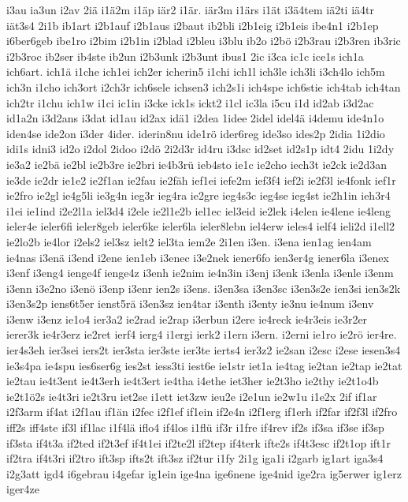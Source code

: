 {i3au
ia3un
i2av
2iä
i1ä2m
i1äp
iär2
i1är.
iär3m
i1ärs
i1ät
i3ä4tem
iä2ti
iä4tr
iät3s4
2i1b
ib1art
i2b1auf
i2b1aus
i2baut
ib2bli
i2b1eig
i2b1eis
ibe4n1
i2b1ep
i6ber6geb
ibe1ro
i2bim
i2b1in
i2blad
i2bleu
i3blu
ib2o
i2bö
i2b3rau
i2b3ren
ib3ric
i2b3roc
ib2ser
ib4ste
ib2un
i2b3unk
i2b3unt
ibus1
2ic
i3ca
ic1c
ice1s
ich1a
ich6art.
ich1ä
i1che
ich1ei
ich2er
icherin5
i1chi
ich1l
ich3le
ich3li
i3ch4lo
ich5m
ich3n
i1cho
ich3ort
i2ch3r
ich6sele
ichsen3
ich2s1i
ich4spe
ich6stie
ich4tab
ich4tan
ich2tr
i1chu
ich1w
i1ci
ic1in
i3cke
ick1s
ickt2
i1cl
ic3la
i5cu
i1d
id2ab
i3d2ac
id1a2n
i3d2ans
i3dat
id1au
id2ax
idä1
i2dea
1idee
2idel
idel4ä
i4demu
ide4n1o
iden4se
ide2on
i3der
4ider.
iderin8nu
ide1rö
ider6reg
ide3so
ides2p
2idia
1i2dio
idi1s
idni3
id2o
i2dol
2idoo
i2dö
2i2d3r
id4ru
i3dsc
id2set
id2s1p
idt4
2idu
1i2dy
ie3a2
ie2bä
ie2bl
ie2b3re
ie2bri
ie4b3rü
ieb4sto
ie1c
ie2cho
iech3t
ie2ck
ie2d3an
ie3de
ie2dr
ie1e2
ie2f1an
ie2fau
ie2fäh
ief1ei
iefe2m
ief3f4
ief2i
ie2f3l
ie4fonk
ief1r
ie2fro
ie2gl
ie4g5li
ie3g4n
ieg3r
ieg4ra
ie2gre
ieg4s3c
ieg4se
ieg4st
ie2h1in
ieh3r4
i1ei
ie1ind
i2e2l1a
iel3d4
i2ele
ie2l1e2b
iel1ec
iel3eid
ie2lek
i4elen
ie4lene
ie4leng
ieler4e
ieler6fi
ieler8geb
ieler6ke
ieler6la
ieler8lebn
iel4erw
ieles4
ielf4
ieli2d
i1ell2
ie2lo2b
ie4lor
i2els2
iel3sz
ielt2
iel3ta
iem2e
2i1en
i3en.
i3ena
ien1ag
ien4am
ie4nas
i3enä
i3end
i2ene
ien1eb
i3enec
i3e2nek
iener6fo
ien3er4g
iener6la
i3enex
i3enf
i3eng4
ienge4f
ienge4z
i3enh
ie2nim
ie4n3in
i3enj
i3enk
i3enla
i3enle
i3enm
i3enn
i3e2no
i3enö
i3enp
i3enr
ien2s
i3ens.
i3en3sa
i3en3sc
i3en3s2e
ien3si
ien3s2k
i3en3s2p
iens6t5er
ienst5rä
i3en3sz
ien4tar
i3enth
i3enty
ie3nu
ie4num
i3env
i3enw
i3enz
ie1o4
ier3a2
ie2rad
ie2rap
i3erbun
i2ere
ie4reck
ie4r3eis
ie3r2er
ierer3k
ie4r3erz
ie2ret
ierf4
ierg4
i1ergi
ierk2
i1ern
i3ern.
i2erni
ie1ro
ie2rö
ier4re.
ier4s3eh
ier3sei
iers2t
ier3sta
ier3ste
ier3te
ierts4
ier3z2
ie2san
i2esc
i2ese
iesen3s4
ie3s4pa
ie4spu
ies6ser6g
ies2st
iess3ti
iest6e
ie1str
iet1a
ie4tag
ie2tan
ie2tap
ie2tat
ie2tau
ie4t3ent
ie4t3erh
ie4t3ert
ie4tha
i4ethe
iet3her
ie2t3ho
ie2thy
ie2t1o4b
ie2t1ö2s
ie4t3ri
ie2t3ru
iet2se
i1ett
iet3zw
ieu2e
i2e1un
ie2w1u
i1e2x
2if
if1ar
i2f3arm
if4at
i2f1au
if1än
i2fec
i2f1ef
if1ein
if2e4n
i2f1erg
if1erh
if2far
if2f3l
if2fro
iff2s
iff4ste
if3l
if1lac
i1f4lä
iflo4
if4los
i1flü
if3r
i1fre
if4rev
if2s
if3sa
if3se
if3sp
if3sta
if4t3a
if2ted
if2t3ef
if4t1ei
if2te2l
if2tep
if4terk
ifte2s
if4t3esc
if2t1op
ift1r
if2tra
if4t3ri
if2tro
ift3sp
ifts2t
ift3sz
if2tur
i1fy
2i1g
iga1i
i2garb
ig1art
iga3s4
i2g3att
igd4
i6gebrau
i4gefar
ig1ein
ige4na
ige6nene
ige4nid
ige2ra
ig5erwer
ig1erz
iger4ze
}
